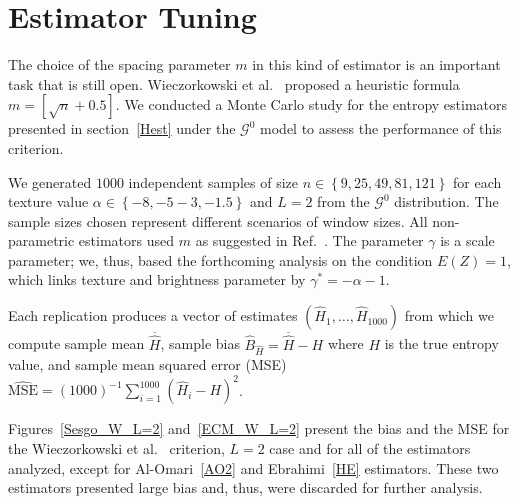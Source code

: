 \documentclass[journal]{IEEEtran}
\begin{document}
\section{Estimator Tuning}\label{sec:simulation}

The choice of the spacing parameter $m$ in this kind of estimator is an important task that is still open. 
Wieczorkowski et al.~\cite{Wieczorkowski1999} proposed a heuristic formula $m=[\sqrt{n}+0.5]$. 
We conducted a Monte Carlo study for the entropy estimators presented in section~\ref{Hest} under the $\mathcal{G}^0$ model to assess the performance of this criterion.

We generated $1000$ independent samples
of size $n \in\left\lbrace 9,25,49,81,121\right\rbrace $ for each texture value $\alpha \in\left\lbrace -8,-5-3,-1.5\right\rbrace $ and $L=2$ from the $\mathcal{G}^0$ distribution. 
The sample sizes chosen represent different scenarios of window sizes. 
All non-parametric estimators used $m$ as suggested in Ref.~\cite{Wieczorkowski1999}.
The parameter $\gamma$ is a scale parameter; we, thus, based the forthcoming analysis on the condition $E(Z)=1$, which links texture and brightness parameter by $\gamma^* =-\alpha-1$. 

Each replication produces a vector  of estimates $(\widehat{H}_1, \dots, \widehat{H}_{1000})$ from which we compute sample mean $\overline{\widehat{H}}$, 
sample bias $\widehat{B}_{\widehat{H}} = \overline{\widehat{H}}- H$ where $H$ is the true entropy value, and sample mean squared error (MSE) $\widehat{\textrm{MSE}}=({1000})^{-1}{\sum_{i=1}^{1000}{(\widehat{H}_i-H)^2}}$.

Figures~\ref{Sesgo_W_L=2} and~\ref{ECM_W_L=2} present the bias and the MSE for the Wieczorkowski et al.~\cite{Wieczorkowski1999} criterion, $L=2$ case and for all of the estimators analyzed, except for Al-Omari~\eqref{AO2} and Ebrahimi~\eqref{HE} estimators.
These two estimators presented large bias and, thus, were discarded for further analysis.  
\end{document}
